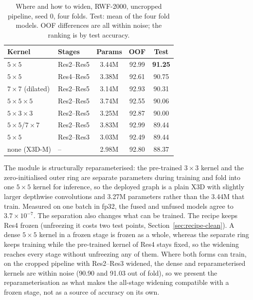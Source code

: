 \documentclass[conference]{IEEEtran}
\begin{document}
\begin{table}[t]
  \centering
  \caption{Where and how to widen, RWF-2000, uncropped pipeline, seed 0,
  four folds. Test: mean of the four fold models. OOF differences are all
  within noise; the ranking is by test accuracy.}
  \label{tab:placement}
  \setlength{\tabcolsep}{3pt}
  \begin{tabular}{llccc}
    \toprule
    Kernel & Stages & Params & OOF & Test \\
    \midrule
    $5\times5$            & Res2--Res5 & 3.44M & 92.99 & \textbf{91.25} \\
    $5\times5$            & Res4--Res5 & 3.38M & 92.61 & 90.75 \\
    $7\times7$ (dilated)  & Res2--Res5 & 3.14M & 92.93 & 90.31 \\
    $5\times5\times5$     & Res2--Res5 & 3.74M & 92.55 & 90.06 \\
    $5\times3\times3$     & Res2--Res5 & 3.25M & 92.87 & 90.00 \\
    $5\times5$/$7\times7$ & Res2--Res5 & 3.83M & 92.99 & 89.44 \\
    $5\times5$            & Res2--Res3 & 3.03M & 92.49 & 89.44 \\
    none (X3D-M)          & --         & 2.98M & 92.80 & 88.37 \\
    \bottomrule
  \end{tabular}
\end{table}

The module is structurally reparameterised: the pre-trained $3\times3$
kernel and the zero-initialised outer ring are separate parameters during
training and fold into one $5\times5$ kernel for inference, so the deployed
graph is a plain X3D with slightly larger depthwise convolutions and 3.27M
parameters rather than the 3.44M that train. Measured on one batch in fp32,
the fused and unfused models agree to $3.7\times10^{-7}$. The separation
also changes what can be trained. The recipe keeps Res4 frozen (unfreezing
it costs two test points, Section~\ref{sec:recipe-clean}). A dense
$5\times5$ kernel in a frozen stage is frozen as a whole, whereas the
separate ring keeps training while the pre-trained kernel of Res4 stays
fixed, so the widening reaches every stage without unfreezing any of them.
Where both forms can train, on the cropped pipeline with Res2--Res3
widened, the dense and reparameterised kernels are within noise (90.90 and
91.03 out of fold), so we present the reparameterisation as what makes the
all-stage widening compatible with a frozen stage, not as a source of
accuracy on its own.
\end{document}
